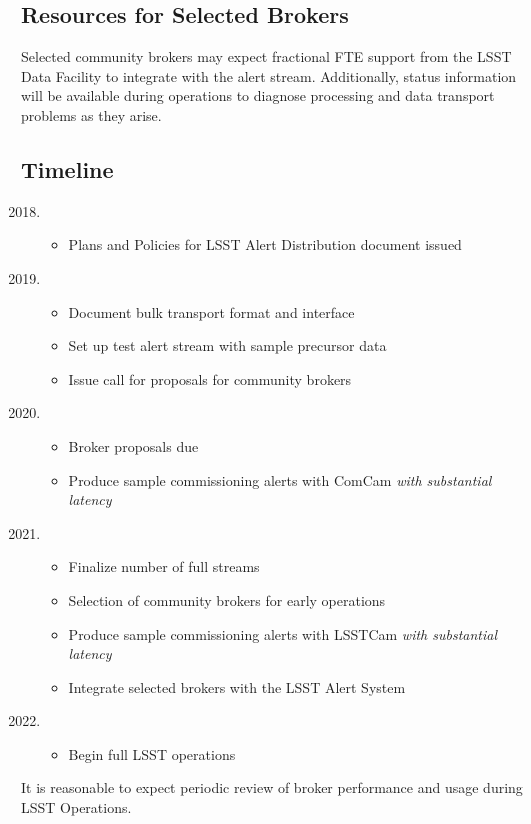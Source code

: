 \subsection{Resources for Selected Brokers}

Selected community brokers may expect fractional FTE support from the LSST Data Facility to integrate with the alert stream.  
Additionally, status information will be available during operations to diagnose processing and data transport problems as they arise.

\subsection{Timeline}

\begin{enumerate}
  \setcounter{enumi}{2017}
	\item \begin{itemize}
		\item Plans and Policies for LSST Alert Distribution document issued
	\end{itemize}
	\item \begin{itemize}
		\item Document bulk transport format and interface
		\item Set up test alert stream with sample precursor data
		\item Issue call for proposals for community brokers
		\end{itemize}
	\item \begin{itemize}
		\item Broker proposals due
		\item Produce sample commissioning alerts with ComCam \textit{with substantial latency}
		\end{itemize}
	\item \begin{itemize}
			\item Finalize number of full streams
			\item Selection of community brokers for early operations
			\item Produce sample commissioning alerts with LSSTCam \textit{with substantial latency}
			\item Integrate selected brokers with the LSST Alert System
		\end{itemize}

	\item \begin{itemize}
			\item Begin full LSST operations
	\end{itemize}

\end{enumerate}

It is reasonable to expect periodic review of broker performance and usage during LSST Operations.
